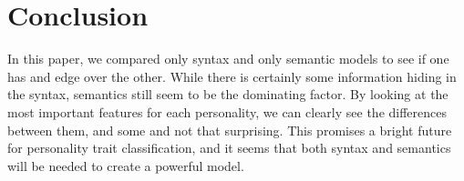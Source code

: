 \documentclass[10pt, a4paper]{article}
\begin{document}
\section{Conclusion}
In this paper, we compared only syntax and only semantic models to see if one has and edge over the other.
While there is certainly some information hiding in the syntax, semantics still seem to be the dominating factor.
By looking at the most important features for each personality, we can clearly see the differences between them, and some and not that surprising.
This promises a bright future for personality trait classification, and it seems that both syntax and semantics will be needed to create a powerful model.



\end{document}
